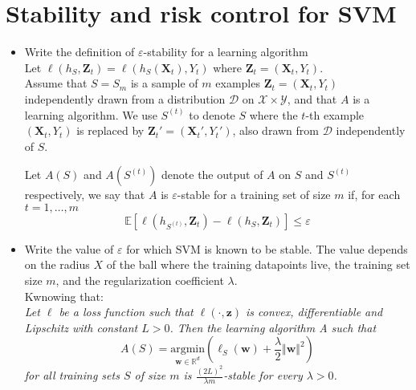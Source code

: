 \newpage
\section{Stability and risk control for SVM}

\begin{itemize}
    
    \item Write the definition of $\varepsilon$-stability for a learning algorithm\\

    Let $\ell(h_{S}, \boldsymbol{Z}_t) = \ell(h_{S}(\boldsymbol{X}_t), Y_t)$ where $\boldsymbol{Z}_t = (\boldsymbol{X}_t, Y_t)$.\\
        Assume that $S = S_m$ is a sample of $m$ examples $\boldsymbol{Z}_t = (\boldsymbol{X}_t, Y_t)$ independently drawn from a distribution $\mathcal{D}$ on $\mathcal{X} \times \mathcal{Y}$, and that $A$ is a learning algorithm. We use $S^{(t)}$ to denote $S$ where the $t$-th example $(\boldsymbol{X}_t, Y_t)$ is replaced by $\boldsymbol{Z}_t' = (\boldsymbol{X}_t', Y_t')$, also drawn from $\mathcal{D}$ independently of $S$.
        
        Let $A(S)$ and $A(S^{(t)})$ denote the output of $A$ on $S$ and $S^{(t)}$ respectively, we say that $A$ is $\varepsilon$-stable for a training set of size $m$ if, for each $t = 1, \dots, m$
        \begin{equation}
            \mathbb{E}\left[\ell(h_{S^{(t)}}, \boldsymbol{Z}_t) - \ell(h_{S}, \boldsymbol{Z}_t)\right] \leq \varepsilon
        \end{equation}

    \item Write the value of $\varepsilon$ for which SVM is known to be stable. The value depends on the radius $X$ of the ball where the training datapoints live, the training set size $m$, and the regularization coefficient $\lambda$.\\
       
        Kwnowing that:\\ 
        \textit{Let $\ell$ be a loss function such that $\ell(\cdot, \boldsymbol{z})$ is convex, differentiable and Lipschitz with constant $L > 0$. Then the learning algorithm A such that}
        $$
        A(S) = \underset{\boldsymbol{w} \in \mathbb{R}^d}{\text{argmin}} \left( \ell_S(\boldsymbol{w}) + \frac{\lambda}{2} \Vert \boldsymbol{w} \Vert^2 \right)
        $$
    \textit{for all training sets $S$ of size $m$ is $\frac{(2L)^2}{\lambda m}$-stable for every $\lambda > 0$.}


\end{itemize}
